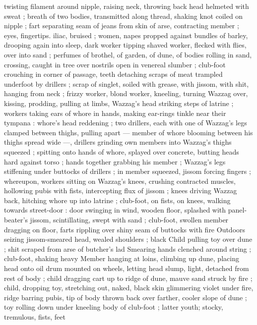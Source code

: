 {twisting filament around nipple, raising neck, throwing back head 
helmeted with sweat ; breath of two bodies, transmitted along 
thread, shaking knot coiled on nipple ; fart separating seam of jeans 
from skin of arse, contracting member ; eyes, fingertips. iliac, 
bruised ; women, napes propped against bundles of barley, drooping 
again into sleep, dark worker tipping shaved worker, flecked with 
flies, over into sand ; perfumes of brothel, of garden, of dune, of 
bodies rolling in sand, crossing, caught in tree over nostrils open in 
venereal slumber ; club-foot crouching in corner of passage, teeth 
detaching scraps of meat trampled underfoot by drillers ; scrap of 
singlet, soiled with grease, with jissom, with shit, hanging from neck 
; frizzy worker, blond worker, kneeling, turning Wazzag over, kissing, 
prodding, pulling at limbs, Wazzag's head striking steps of latrine ; 
workers taking ears of whore in hands, making ear-rings tinkle near 
their tympana : whore's head reddening ; two drillers, each with one 
of Wazzag's legs clamped between thighs, pulling apart --- member 
of whore blooming between his thighs spread wide ---, drillers 
grinding own members into Wazzag's thighs squeezed ; spitting onto 
hands of whore, splayed over concrete, butting heads hard against 
torso ; hands together grabbing his member ; Wazzag's legs 
stiffening under buttocks of drillers ; in member squeezed, jissom 
forcing fingers ; whereupon, workers sitting on Wazzag's knees, 
crushing contracted muscles, hollowing pubis with fists, intercepting 
flux of jissom ; knees driving Wazzag back, hitching whore up into 
latrine ; club-foot, on fists, on knees, walking towards street-door : 
door swinging in wind, wooden floor, splashed with panel-beater's 
jissom, scintillating, swept with sand ; club-foot, swollen member 
dragging on floor, farts rippling over shiny seam of buttocks with fire 
Outdoors seizing jissom-smeared head, wealed shoulders ; black 
Child pulling toy over dune ; shit scraped from arse of butcher's lad 
Smearing hands clenched around string ; club-foot, shaking heavy 
Member hanging at loins, climbing up dune, placing head onto oil 
drum mounted on wheels, letting head slump, light, detached from 
rest of body ; child dragging cart up to ridge of dune, mauve sand 
struck by fire ; child, dropping toy, stretching out, naked, black skin 
glimmering violet under fire, ridge barring pubis, tip of body thrown 
back over farther, cooler slope of dune ; toy rolling down under 
kneeling body of club-foot ; latter youth; stocky, tremulous, fists, feet 
}
